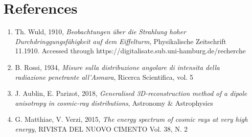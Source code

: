 \documentclass{article}
\begin{document}
\section{References}
\begin{enumerate}
    \item Th. Wuld, 1910, \emph{Beobachtungen \"uber die Strahlung hoher Durchdringgungsf\"ahigkeit auf dem Eiffelturm}, Physikalische Zeitschrift 11.1910. Accessed through https://digitalisate.sub.uni-hamburg.de/recherche
    \item B. Rossi, 1934, \emph{Misure sulla distribuzione angolare di intensita della radiazione penetrante all'Asmara}, Ricerca Scientifica, vol. 5
    \item J. Aublin, E. Parizot, 2018, \emph{Generalised 3D-reconstruction method of a dipole anisotropy in cosmic-ray distributions}, Astronomy \& Astrophysics
    \item G. Matthiae,  V. Verzi, 2015, \emph{The energy spectrum of cosmic rays at very high energy}, RIVISTA DEL NUOVO CIMENTO Vol. 38, N. 2
\end{enumerate}
\end{document}
